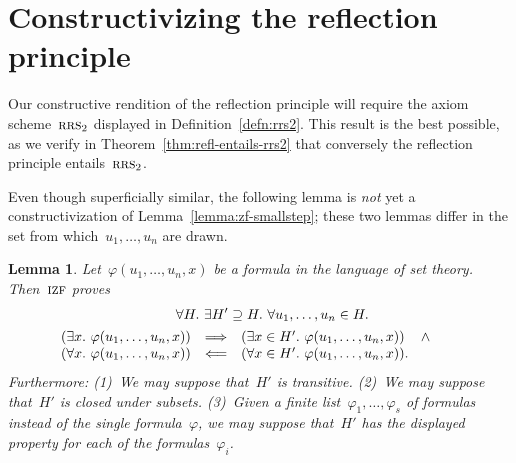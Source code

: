\documentclass[oneside,reqno]{amsart}
\theoremstyle{definition}
\theoremstyle{plain}
\newtheorem{lemma}[defn]{Lemma}
\theoremstyle{remark}
\renewcommand{\_}{\mathpunct{.}\,}
\newcommand{\?}{\,{:}\,}
\newcommand{\IZF}{\textsc{izf}}
\newcommand{\RRS}{\textsc{rrs}}
\begin{document}
\section{Constructivizing the reflection principle}
\label{sect:constructive-proof}

Our constructive rendition of the reflection principle will require the axiom
scheme~$\RRS_2$ displayed in Definition~\ref{defn:rrs2}. This result is the
best possible, as we verify in Theorem~\ref{thm:refl-entails-rrs2} that
conversely the reflection principle entails~$\RRS_2$.

Even though superficially similar, the following lemma is \emph{not} yet a
constructivization of Lemma~\ref{lemma:zf-smallstep}; these two lemmas differ
in the set from which~$u_1,\ldots,u_n$ are drawn.

\begin{lemma}\label{lemma:izf-microstep}
Let~$\varphi(u_1,\ldots,u_n,x)$ be a formula in the language of set
theory. Then~$\IZF$ proves
\begin{multline*}
  {\qquad}\forall H\_
  \exists H' \supseteq H\_
  \forall u_1,\ldots,u_n \in H\_ \\
  \begin{array}{@{}rcl@{}}
  (\exists x\_ \varphi(u_1,\ldots,u_n,x)) &\Longrightarrow&
  (\exists x \in H'\_ \varphi(u_1,\ldots,u_n,x)) \quad\mathop{\wedge} \\
  (\forall x\_ \varphi(u_1,\ldots,u_n,x)) &\Longleftarrow&
  (\forall x \in H'\_ \varphi(u_1,\ldots,u_n,x)).\end{array}
  {\qquad}
\end{multline*}
Furthermore: (1)~We may suppose that~$H'$ is transitive. (2)~We may suppose
that~$H'$ is closed under subsets. (3)~Given a finite
list~$\varphi_1,\ldots,\varphi_s$ of formulas instead of the single
formula~$\varphi$, we may suppose that~$H'$ has the displayed property for each
of the formulas~$\varphi_i$.
\end{lemma}
\end{document}
